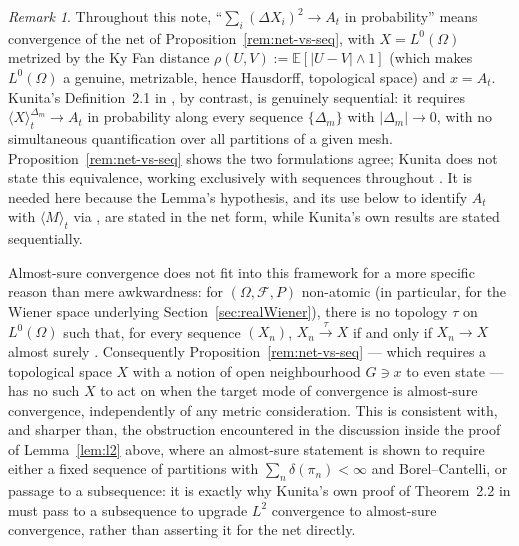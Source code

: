\documentclass[11pt,fleqn]{article}
\def\E{\mathbb E}
\theoremstyle{plain}
\theoremstyle{remark}
\newtheorem{remark}[thm]{Remark}
\begin{document}
\begin{remark}
Throughout this note, ``$\sum_i(\Delta X_i)^2\to A_t$ in probability''
means convergence of the net of
Proposition~\ref{rem:net-vs-seq}, with $X=L^0(\Omega)$ metrized by the Ky
Fan distance $\rho(U,V):=\E[|U-V|\wedge1]$ (which makes $L^0(\Omega)$ a
genuine, metrizable, hence Hausdorff, topological space) and $x=A_t$.
Kunita's Definition~2.1 in \cite{Kunita82}, by contrast, is genuinely
sequential: it requires $\langle X\rangle_t^{\Delta_m}\to A_t$ in
probability along every sequence $\{\Delta_m\}$ with $|\Delta_m|\to0$,
with no simultaneous quantification over all partitions of a given mesh.
Proposition~\ref{rem:net-vs-seq} shows the two formulations agree; Kunita
does not state this equivalence, working exclusively with sequences
throughout \cite{Kunita82}. It is needed here because the Lemma's
hypothesis, and its use below to identify $A_t$ with $\langle
M\rangle_t$ via \cite{Kunita82}, are stated in the net form, while
Kunita's own results are stated sequentially.

Almost-sure convergence does not fit into this framework for a more
specific reason than mere awkwardness: for $(\Omega,\mathcal F,P)$
non-atomic (in particular, for the Wiener space underlying
Section~\ref{sec:realWiener}), there is no topology $\tau$ on
$L^0(\Omega)$ such that, for every sequence $(X_n)$,
$X_n\xrightarrow{\tau}X$ if and only if $X_n\to X$ almost surely
\cite{Ordman66}. Consequently Proposition~\ref{rem:net-vs-seq} --- which
requires a topological space $X$ with a notion of open neighbourhood
$G\ni x$ to even state --- has no such $X$ to act on when the target mode
of convergence is almost-sure convergence, independently of any metric
consideration. This is consistent with, and sharper than, the
obstruction encountered in the discussion inside the proof of
Lemma~\ref{lem:l2} above, where an almost-sure statement is shown to
require either a fixed sequence of partitions with
$\sum_n\delta(\pi_n)<\infty$ and Borel--Cantelli, or passage to a
subsequence: it is exactly why Kunita's own proof of Theorem~2.2 in
\cite{Kunita82} must pass to a subsequence to upgrade $L^2$ convergence to
almost-sure convergence, rather than asserting it for the net directly.
\end{remark}
\end{document}
